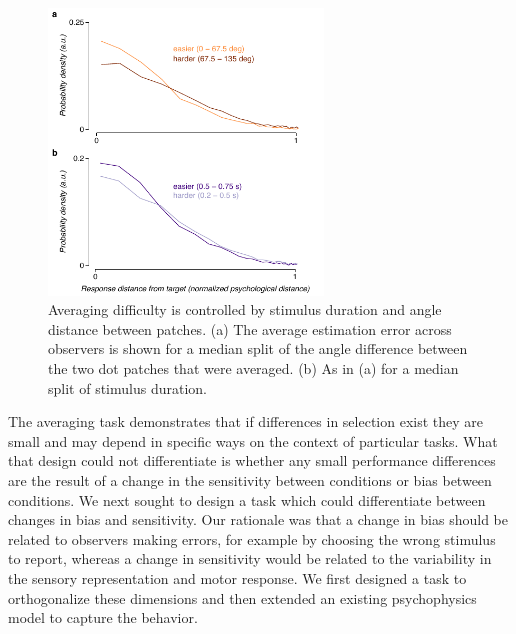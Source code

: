 \begin{figure}
\centering
\includegraphics[keepaspectratio,width=0.65\textwidth]{figs_c4/f2_aca_parameters.pdf}
\caption[Parameters that control difficulty of averaging]{Averaging difficulty is controlled by stimulus duration and angle distance between patches. (a) The average estimation error across observers is shown for a median split of the angle difference between the two dot patches that were averaged. (b) As in (a) for a median split of stimulus duration.}
\label{fig:c4f3}
\end{figure}

The averaging task demonstrates that if differences in selection exist they are small and may depend in specific ways on the context of particular tasks. What that design could not differentiate is whether any small performance differences are the result of a change in the sensitivity between conditions or bias between conditions. We next sought to design a task which could differentiate between changes in bias and sensitivity. Our rationale was that a change in bias should be related to observers making errors, for example by choosing the wrong stimulus to report, whereas a change in sensitivity would be related to the variability in the sensory representation and motor response. We first designed a task to orthogonalize these dimensions and then extended an existing psychophysics model to capture the behavior. 

